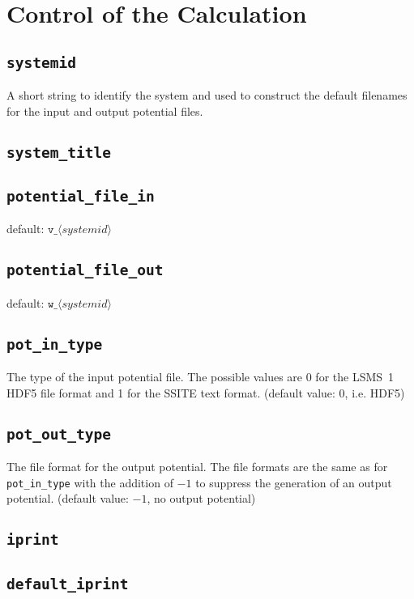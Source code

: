 \section{Control of the Calculation}

\subsection{\texttt{systemid}}
A short string to identify the system and used to construct the
default filenames for the input and output potential files.



\subsection{\texttt{system\_title}}

\subsection{\texttt{potential\_file\_in}}
default: $\texttt{v\_}\langle\textit{systemid}\rangle$

\subsection{\texttt{potential\_file\_out}}
default: $\texttt{w\_}\langle\textit{systemid}\rangle$

\subsection{\texttt{pot\_in\_type}}
The type of the input potential file. The possible values are 0 for
the LSMS~1 HDF5 file format and 1 for the SSITE text format.
(default value: 0, i.e. HDF5)

\subsection{\texttt{pot\_out\_type}}
The file format for the output potential. The file formats are the
same as for \texttt{pot\_in\_type} with the addition of $-1$ to
suppress the generation of an output potential.
(default value: $-1$, no output potential)

\subsection{\texttt{iprint}}

\subsection{\texttt{default\_iprint}}

